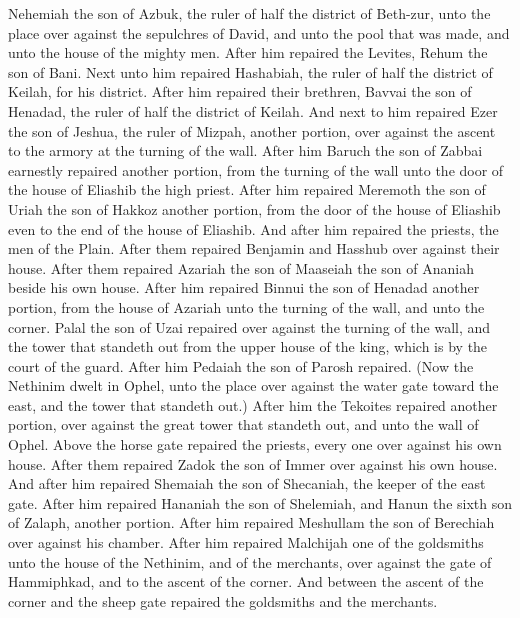 Nehemiah the son of Azbuk, the ruler of half the district of Beth-zur, unto the place over against the sepulchres of David, and unto the pool that was made, and unto the house of the mighty men. After him repaired the Levites, Rehum the son of Bani. Next unto him repaired Hashabiah, the ruler of half the district of Keilah, for his district. After him repaired their brethren, Bavvai the son of Henadad, the ruler of half the district of Keilah. And next to him repaired Ezer the son of Jeshua, the ruler of Mizpah, another portion, over against the ascent to the armory at the turning of the wall. After him Baruch the son of Zabbai earnestly repaired another portion, from the turning of the wall unto the door of the house of Eliashib the high priest. After him repaired Meremoth the son of Uriah the son of Hakkoz another portion, from the door of the house of Eliashib even to the end of the house of Eliashib. And after him repaired the priests, the men of the Plain. After them repaired Benjamin and Hasshub over against their house. After them repaired Azariah the son of Maaseiah the son of Ananiah beside his own house. After him repaired Binnui the son of Henadad another portion, from the house of Azariah unto the turning of the wall, and unto the corner. Palal the son of Uzai repaired over against the turning of the wall, and the tower that standeth out from the upper house of the king, which is by the court of the guard. After him Pedaiah the son of Parosh repaired. (Now the Nethinim dwelt in Ophel, unto the place over against the water gate toward the east, and the tower that standeth out.) After him the Tekoites repaired another portion, over against the great tower that standeth out, and unto the wall of Ophel.  Above the horse gate repaired the priests, every one over against his own house. After them repaired Zadok the son of Immer over against his own house. And after him repaired Shemaiah the son of Shecaniah, the keeper of the east gate. After him repaired Hananiah the son of Shelemiah, and Hanun the sixth son of Zalaph, another portion. After him repaired Meshullam the son of Berechiah over against his chamber. After him repaired Malchijah one of the goldsmiths unto the house of the Nethinim, and of the merchants, over against the gate of Hammiphkad, and to the ascent of the corner. And between the ascent of the corner and the sheep gate repaired the goldsmiths and the merchants. 

